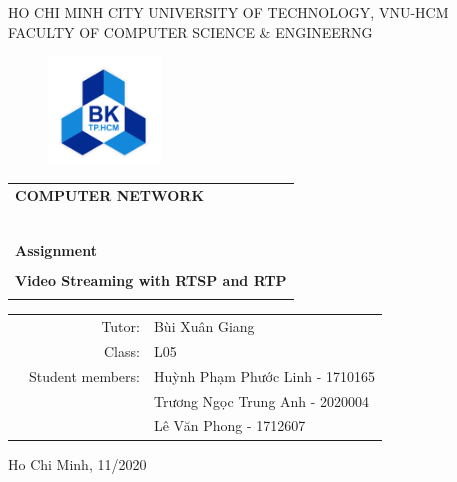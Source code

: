 \documentclass[a4paper]{article}
\begin{document}
\begin{titlepage}

\begin{center}
HO CHI MINH CITY UNIVERSITY OF TECHNOLOGY, VNU-HCM\\
FACULTY OF COMPUTER SCIENCE \& ENGINEERNG
\end{center}

\vspace{1cm}

\begin{figure}[H]
\begin{center}
\includegraphics[width=3cm]{hcmut.png}
\end{center}
\end{figure}

\vspace{1cm}


\begin{center}
\begin{tabular}{c}
\multicolumn{1}{l}{\textbf{{\Large COMPUTER NETWORK}}}\\
~~\\
\hline
\\
\multicolumn{1}{l}{\textbf{{\Large Assignment}}}\\
\\
\textbf{\Huge Video Streaming with RTSP and RTP}\\
\\
\hline
\end{tabular}
\end{center}

\vspace{3cm}

\begin{table}[h]
\begin{tabular}{rrl}

\hspace{5 cm} & Tutor: & Bùi Xuân Giang\\
& Class: & L05\\
& Student members: & Huỳnh Phạm Phước Linh - 1710165 \\
& & Trương Ngọc Trung Anh - 2020004 \\
& & Lê Văn Phong - 1712607 \\


\end{tabular}
\end{table}

\begin{center}
{\footnotesize Ho Chi Minh, 11/2020}
\end{center}
\end{titlepage}
\end{document}
